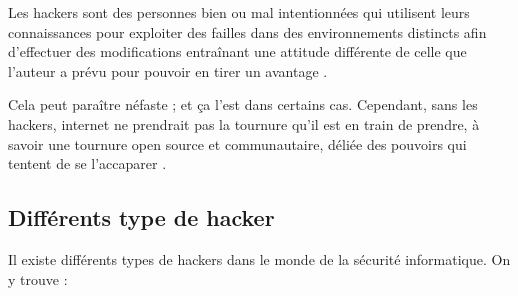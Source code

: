     Les hackers sont des personnes bien ou mal intentionnées qui utilisent leurs connaissances pour exploiter 
    des failles dans des environnements distincts afin d'effectuer des modifications entraînant une attitude 
    différente de celle que l'auteur a prévu pour pouvoir en tirer un avantage \cite{hacking} . %

    Cela peut paraître néfaste ; et ça l'est dans certains cas. Cependant, sans les hackers, internet ne prendrait 
    pas la tournure qu'il est en train de prendre, à savoir une tournure open source et communautaire, 
    déliée des pouvoirs qui tentent de se l'accaparer \cite{hacking} . %

    \subsection{Différents type de hacker}
    Il existe différents types de hackers dans le monde de la sécurité informatique. On y trouve : %
    \cite{types_de_hacker}

